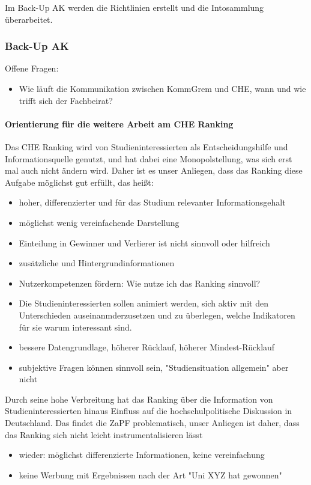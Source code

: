       Im Back-Up AK werden die Richtlinien erstellt und die Intosammlung überarbeitet.

    \subsubsection*{Back-Up AK}
    Offene Fragen:
    \begin{itemize}
      \item Wie läuft die Kommunikation zwischen KommGrem und CHE, wann und wie trifft sich der Fachbeirat?
    \end{itemize}

    \paragraph{Orientierung für die weitere Arbeit am CHE Ranking}

      Das CHE Ranking wird von Studieninteressierten als Entscheidungshilfe und Informationsquelle genutzt, und hat dabei eine Monopolstellung, was sich erst mal auch nicht ändern wird. Daher ist es unser Anliegen, dass das Ranking diese Aufgabe möglichst gut erfüllt, das heißt:
      \begin{itemize}
        \item hoher, differenzierter und für das Studium relevanter Informationsgehalt
        \item möglichst wenig vereinfachende Darstellung
        \item Einteilung in Gewinner und Verlierer ist nicht sinnvoll oder hilfreich
        \item zusätzliche und Hintergrundinformationen
        \item Nutzerkompetenzen fördern: Wie nutze ich das Ranking sinnvoll?
        \item Die Studieninteressierten sollen animiert werden, sich aktiv mit den Unterschieden auseinanmderzusetzen und zu überlegen, welche Indikatoren für sie warum interessant sind.
        \item bessere Datengrundlage, höherer Rücklauf, höherer Mindest-Rücklauf
        \item subjektive Fragen können sinnvoll sein, "Studiensituation allgemein" aber nicht
      \end{itemize}

      Durch seine hohe Verbreitung hat das Ranking über die Information von Studieninteressierten hinaus Einfluss auf die hochschulpolitische Diskussion in Deutschland. Das findet die ZaPF problematisch, unser Anliegen ist daher, dass das Ranking sich nicht leicht instrumentalisieren lässt
      \begin{itemize}
        \item wieder: möglichst differenzierte Informationen, keine vereinfachung
        \item keine Werbung mit Ergebnissen nach der Art "Uni XYZ hat gewonnen"
      \end{itemize}

